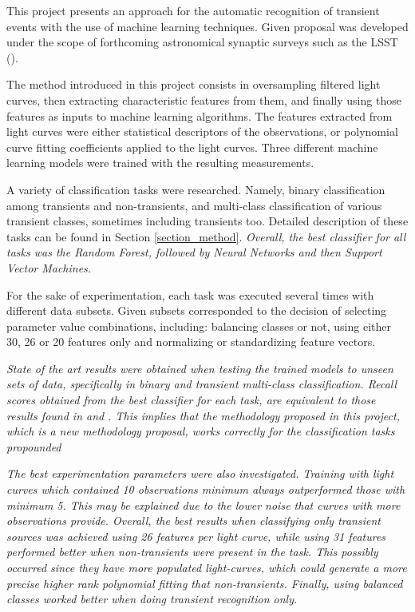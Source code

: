 This project presents an approach for the automatic recognition of transient events with the use of machine learning techniques. Given proposal was developed under the scope of forthcoming astronomical synaptic surveys such as the LSST (\cite{0805.2366}).

The method introduced in this project consists in oversampling filtered light curves, then extracting characteristic features from them, and finally using those features as inputs to machine learning algorithms. The features extracted from light curves were either statistical descriptors of the observations, or polynomial curve fitting coefficients applied to the light curves.  
Three different machine learning models were trained with the resulting measurements.

A variety of classification tasks were researched. Namely, binary classification among transients and non-transients, and multi-class classification of various transient classes, sometimes including transients too. Detailed description of these tasks can be found in Section \ref{section_method}. 
\textit{Overall, the best classifier for all tasks was the Random Forest, followed by Neural Networks and then Support Vector Machines.}

For the sake of experimentation, each task was executed several times with different data subsets. Given subsets corresponded to the decision of selecting parameter value combinations, including: balancing classes or not, using either 30, 26 or 20 features only and normalizing or standardizing feature vectors.

\textit{State of the art results were obtained when testing the trained models to unseen sets of data, specifically in binary and transient multi-class classification. Recall scores obtained from the best classifier for each task, are equivalent to those results found in \cite{1401.3211} and \cite{1601.03931}. This implies that the methodology proposed in this project, which is a new methodology proposal, works correctly for the classification tasks propounded}

\textit{
The best experimentation parameters were also investigated. 
Training with light curves which contained 10 observations minimum always outperformed those with minimum 5. This may be explained due to the lower noise that curves with more observations provide.
Overall, the best results when classifying only transient sources was achieved using 26 features per light curve, while using 31 features performed better when non-transients were present in the task. This possibly occurred since they have more populated light-curves, which could generate a more precise higher rank polynomial fitting that non-transients.
Finally, using balanced classes worked better when doing transient recognition only.
}

